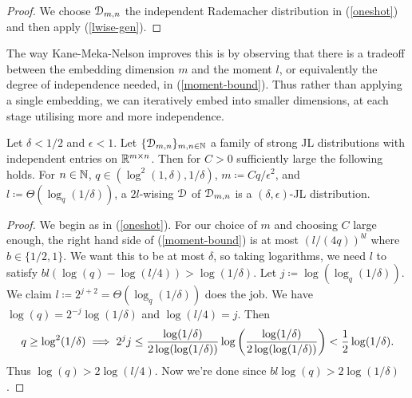 \begin{proof}
  We choose $\mathcal{D}_{m,n}$ the independent Rademacher distribution in
  (\ref{oneshot}) and then apply (\ref{lwise-gen}).
\end{proof}

The way Kane-Meka-Nelson improves this is by observing that there is a
tradeoff between the embedding dimension $m$ and the moment $l$, or
equivalently the degree of independence needed, in
(\ref{moment-bound}). Thus rather than applying a single embedding, we
can iteratively embed into smaller dimensions, at each stage utilising
more and more independence.

\begin{proposition}
  \label{qbound}
  Let $\delta < 1/2$ and $\epsilon < 1$. Let $\{\mathcal{D}_{m,n}\}_{m,n \in
    \mathbb{N}}$ a family of strong JL distributions with independent entries
  on $\mathbb{R}^{m \times n}$. Then for $C > 0$ sufficiently large the
  following holds. For $n \in \mathbb{N}$, $q \in (\log^2(1,\delta),
  1/\delta)$, $m \coloneqq Cq/\epsilon^2$, and $l \coloneqq
  \Theta(\log_q(1/\delta))$, a $2l$-wising $\mathcal{D}$ of $\mathcal{D}_{m,n}$ is a
  $(\delta,\epsilon)$-JL distribution.
\end{proposition}

\begin{proof}
  We begin as in (\ref{oneshot}). For our choice of $m$ and choosing
  $C$ large enough, the right hand side of (\ref{moment-bound}) is at
  most $(l/(4q))^{b l}$ where $b \in \{1/2,1\}$. We want this to be at
  most $\delta$, so taking logarithms, we need $l$ to satisfy
  $bl(\log(q) - \log(l/4)) > \log(1/\delta)$. Let $j \coloneqq
  \log(\log_q(1/\delta))$. We claim $l \coloneqq 2^{j+2} =
  \Theta(\log_q(1/\delta))$ does the job. We have $\log(q) =
  2^{-j}\log(1/\delta)$ and $\log(l/4) = j$. Then
  \[
  q \ge \log^2(1/\delta) \implies 2^jj \le
  \frac{\log(1/\delta)}{2\log(\log(1/\delta))} \log\left(
  \frac{\log(1/\delta)}{2\log(\log(1/\delta))} \right) < \frac{1}{2}
  \log(1/\delta).
  \]
  Thus $\log(q) > 2\log(l/4)$. Now we're done since $bl \log(q) > 2
  \log(1/\delta)$.
\end{proof}

\newcommand{\final}{\text{final}}

